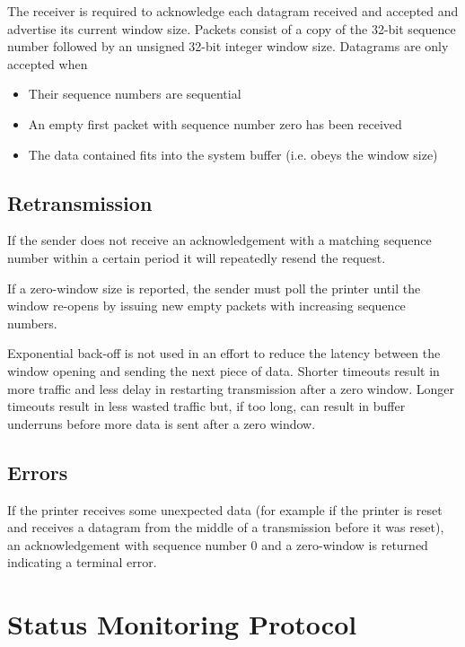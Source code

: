 			The receiver is required to acknowledge each datagram received and
			accepted and advertise its current window size. Packets consist of a copy
			of the 32-bit sequence number followed by an unsigned 32-bit integer
			window size. Datagrams are only accepted when
			\begin{itemize}
				
				\item Their sequence numbers are sequential
				
				\item An empty first packet with sequence number zero has been received
				
				\item The data contained fits into the system buffer (i.e. obeys the
				window size)
				
			\end{itemize}
			
		\subsection{Retransmission}
			
			If the sender does not receive an acknowledgement with a matching sequence
			number within a certain period it will repeatedly resend the request.
			
			If a zero-window size is reported, the sender must poll the printer until
			the window re-opens by issuing new empty packets with increasing sequence
			numbers.
			
			Exponential back-off is not used in an effort to reduce the latency
			between the window opening and sending the next piece of data. Shorter
			timeouts result in more traffic and less delay in restarting transmission
			after a zero window. Longer timeouts result in less wasted traffic but, if
			too long, can result in buffer underruns before more data is sent after a
			zero window.
			
		\subsection{Errors}
			
			If the printer receives some unexpected data (for example if the printer
			is reset and receives a datagram from the middle of a transmission before
			it was reset), an acknowledgement with sequence number 0 and a zero-window
			is returned indicating a terminal error.
			
	\section{Status Monitoring Protocol}
		
